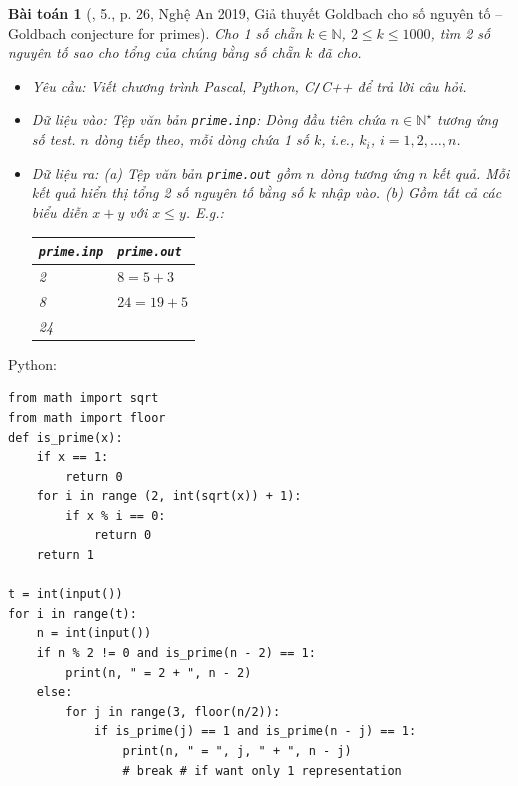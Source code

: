 \documentclass{article}
\newtheorem{baitoan}{Bài toán}
\begin{document}
\begin{baitoan}[\cite{VietSTEM2021}, 5., p. 26, Nghệ An 2019, Giả thuyết Goldbach cho số nguyên tố -- Goldbach conjecture for primes]
	Cho 1 số chẵn $k\in\mathbb{N}$, $2\le k\le1000$, tìm 2 số nguyên tố sao cho tổng của chúng bằng số chẵn $k$ đã cho.
	\begin{itemize}
		\item {\sf Yêu cầu:} Viết chương trình {\sf Pascal, Python, C\texttt{/}C++} để trả lời câu hỏi.
		\item {\sf Dữ liệu vào:} Tệp văn bản \verb|prime.inp|: Dòng đầu tiên chứa $n\in\mathbb{N}^\star$ tương ứng số test. $n$ dòng tiếp theo, mỗi dòng chứa 1 số $k$, i.e., $k_i$, $i = 1,2,\ldots,n$.
		\item {\sf Dữ liệu ra:} (a) Tệp văn bản \verb|prime.out| gồm $n$ dòng tương ứng $n$ kết quả. Mỗi kết quả hiển thị tổng 2 số nguyên tố bằng số $k$ nhập vào. (b) Gồm tất cả các biểu diễn $x + y$ với $x\le y$. E.g.:
		\begin{table}[H]
			\centering
			\begin{tabular}{|l|l|}
				\hline
				\texttt{prime.inp} & \texttt{prime.out} \\
				\hline
				2 & $8 = 5 + 3$ \\
				8 & $24 = 19 + 5$ \\
				24 & \\
				\hline
			\end{tabular}
		\end{table}
	\end{itemize}
\end{baitoan}
Python:
\begin{verbatim}
from math import sqrt
from math import floor
def is_prime(x):
    if x == 1:
        return 0
    for i in range (2, int(sqrt(x)) + 1):
        if x % i == 0:
            return 0
    return 1

t = int(input())
for i in range(t):
    n = int(input())
    if n % 2 != 0 and is_prime(n - 2) == 1:
        print(n, " = 2 + ", n - 2)
    else:
        for j in range(3, floor(n/2)):
            if is_prime(j) == 1 and is_prime(n - j) == 1:
                print(n, " = ", j, " + ", n - j)
                # break # if want only 1 representation
\end{verbatim}
\end{document}
